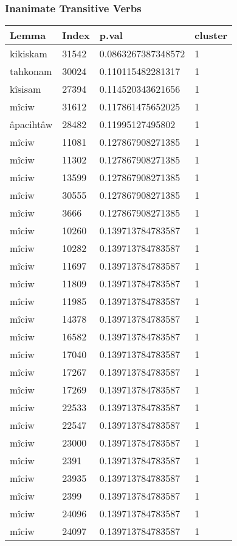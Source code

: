     
\subsubsection{Inanimate Transitive Verbs}
\begin{longtable}{llll}
\toprule
Lemma & Index & p.val & cluster \\
\midrule
kikiskam & 31542 & 0.0863267387348572 & 1 \\
tahkonam & 30024 & 0.110115482281317 & 1 \\
kîsisam & 27394 & 0.114520343621656 & 1 \\
mîciw & 31612 & 0.117861475652025 & 1 \\
âpacihtâw & 28482 & 0.11995127495802 & 1 \\
mîciw & 11081 & 0.127867908271385 & 1 \\
mîciw & 11302 & 0.127867908271385 & 1 \\
mîciw & 13599 & 0.127867908271385 & 1 \\
mîciw & 30555 & 0.127867908271385 & 1 \\
mîciw & 3666 & 0.127867908271385 & 1 \\
mîciw & 10260 & 0.139713784783587 & 1 \\
mîciw & 10282 & 0.139713784783587 & 1 \\
mîciw & 11697 & 0.139713784783587 & 1 \\
mîciw & 11809 & 0.139713784783587 & 1 \\
mîciw & 11985 & 0.139713784783587 & 1 \\
mîciw & 14378 & 0.139713784783587 & 1 \\
mîciw & 16582 & 0.139713784783587 & 1 \\
mîciw & 17040 & 0.139713784783587 & 1 \\
mîciw & 17267 & 0.139713784783587 & 1 \\
mîciw & 17269 & 0.139713784783587 & 1 \\
mîciw & 22533 & 0.139713784783587 & 1 \\
mîciw & 22547 & 0.139713784783587 & 1 \\
mîciw & 23000 & 0.139713784783587 & 1 \\
mîciw & 2391 & 0.139713784783587 & 1 \\
mîciw & 23935 & 0.139713784783587 & 1 \\
mîciw & 2399 & 0.139713784783587 & 1 \\
mîciw & 24096 & 0.139713784783587 & 1 \\
mîciw & 24097 & 0.139713784783587 & 1 \\

\end{longtable}
